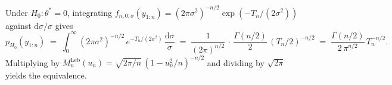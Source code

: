 \documentclass{article}%
\newtheorem{proposition}[theorem]{Proposition}
\newenvironment{proof}[1][Proof]{\noindent\textbf{#1.} }{\ \rule{0.5em}{0.5em}}
\newcommand{\R}{\mathbb{R}}
\begin{document}
Under $H_0 : \theta^* = 0$, integrating $f_{n, 0,
\sigma}(y_{1:n}) = (2\pi\sigma^2)^{-n/2}\exp(-T_n/(2\sigma^2))$
against $\mathrm{d}\sigma/\sigma$ gives
\[
  p_{H_0}(y_{1:n})
  \;=\; \int_0^\infty (2\pi\sigma^2)^{-n/2}\,
        e^{-T_n/(2\sigma^2)}\, \frac{\mathrm{d}\sigma}{\sigma}
  \;=\; \frac{1}{(2\pi)^{n/2}}\, \cdot\, \frac{\Gamma(n/2)}{2}\,
        (T_n/2)^{-n/2}
  \;=\; \frac{\Gamma(n/2)}{2\,\pi^{n/2}}\, T_n^{-n/2}.
\]
Multiplying by $M_n^{\mathrm{Leb}}(u_n) = \sqrt{2\pi/n}\,
(1 - u_n^2/n)^{-n/2}$ and dividing by $\sqrt{2\pi}$ yields
the equivalence.







\end{document}
